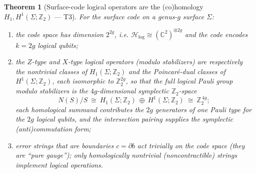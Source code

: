 \documentclass[12pt]{article}
\newtheorem{theorem}{Theorem}[section]
\theoremstyle{definition}
\theoremstyle{remark}
\newcommand{\Ho}{\mathcal{H}}
\newcommand{\Hlog}{\Ho_{\mathrm{log}}}
\newcommand{\ZZ}{\mathbb{Z}}
\newcommand{\CC}{\mathbb{C}}
\begin{document}
\begin{theorem}[Surface-code logical operators are the (co)homology $H_1, H^1(\Sigma;\ZZ_2)$ --- T3]
\label{thm:surface-code}
For the surface code on a genus-$g$ surface $\Sigma$:
\begin{enumerate}
\item the code space has dimension $2^{2g}$, i.e. $\Hlog\cong(\CC^2)^{\otimes 2g}$ and
the code encodes $k=2g$ logical qubits;
\item the $Z$-type and $X$-type logical operators (modulo stabilizers) are respectively
the nontrivial classes of $H_1(\Sigma;\ZZ_2)$ and the Poincar\'e-dual classes of
$H^1(\Sigma;\ZZ_2)$, each isomorphic to $\ZZ_2^{2g}$, so that the full logical Pauli
group modulo stabilizers is the $4g$-dimensional symplectic $\ZZ_2$-space
\[
N(S)/S\ \cong\ H_1(\Sigma;\ZZ_2)\ \oplus\ H^1(\Sigma;\ZZ_2)\ \cong\ \ZZ_2^{\,4g};
\]
each homological summand contributes the $2g$ generators of one Pauli type for the $2g$
logical qubits, and the intersection pairing supplies the symplectic (anti)commutation
form;
\item error strings that are boundaries $c=\partial b$ act trivially on the code space
(they are ``pure gauge''); only homologically nontrivial (noncontractible) strings
implement logical operations.
\end{enumerate}
\end{theorem}
\end{document}
